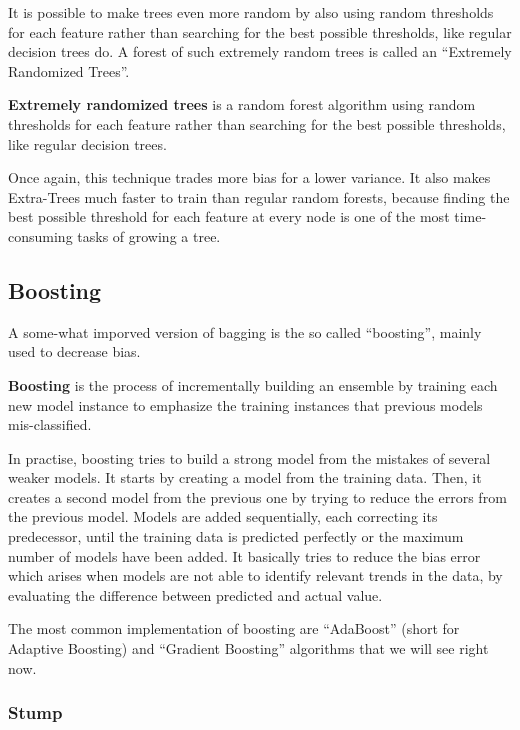 
It is possible to make trees even more random by also using random thresholds for each feature rather than searching
for the best possible thresholds, like regular decision trees do. A forest of such extremely random trees is called
an ``Extremely Randomized Trees''.

\textbf{Extremely randomized trees} is a random forest algorithm using random thresholds for each feature rather than
searching for the best possible thresholds, like regular decision trees.
\ed

Once again, this technique trades more bias for a lower variance. It also makes Extra-Trees much faster to train
than regular random forests, because finding the best possible threshold for each feature at every node is one of
the most time-consuming tasks of growing a tree.

\subsection{Boosting}

A some-what imporved version of bagging is the so called ``boosting'', mainly used to decrease bias.

\bd[Boosting]
\textbf{Boosting} is the process of incrementally building an ensemble by training each new model instance to emphasize
the training instances that previous models mis-classified.
\ed

In practise, boosting tries to build a strong model from the mistakes of several weaker models. It starts by
creating a model from the training data. Then, it creates a second model from the previous one by trying to reduce
the errors from the previous model. Models are added sequentially, each correcting its predecessor, until the
training data is predicted perfectly or the maximum number of models have been added. It basically tries to reduce
the bias error which arises when models are not able to identify relevant trends in the data, by evaluating the
difference between predicted and actual value.


The most common implementation of boosting are ``AdaBoost'' (short for Adaptive  Boosting) and ``Gradient Boosting''
algorithms that we will see right now.

\subsubsection{Stump}

